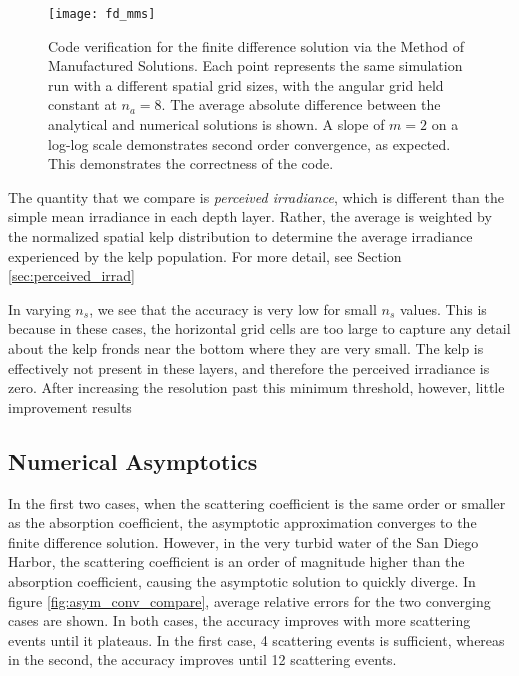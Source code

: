 \begin{figure}[H]
  \centering
  \vspace{-3em}
  \texttt{[image: fd\_mms]}
  \caption{Code verification for the finite difference solution via the Method of Manufactured Solutions. Each point represents the same simulation run with a different spatial grid sizes, with the angular grid held constant at $n_a=8$. The average absolute difference between the analytical and numerical solutions is shown. A slope of $m=2$ on a log-log scale demonstrates second order convergence, as expected. This demonstrates the correctness of the code.}
  \label{fig:fd_mms}
\end{figure}

The quantity that we compare is \textit{perceived irradiance}, which is different than the simple mean irradiance in each depth layer.
Rather, the average is weighted by the normalized spatial kelp distribution to determine the average irradiance experienced by the kelp population.
For more detail, see Section \ref{sec:perceived_irrad}

In varying $n_s$, we see that the accuracy is very low for small $n_s$ values.
This is because in these cases, the horizontal grid cells are too large to capture any detail
about the kelp fronds near the bottom where they are very small.
The kelp is effectively not present in these layers, and therefore the perceived irradiance is zero.
After increasing the resolution past this minimum threshold, however, little improvement results

\subsection{Numerical Asymptotics}

In the first two cases, when the scattering coefficient is the same order or smaller as the absorption coefficient,
the asymptotic approximation converges to the finite difference solution.
However, in the very turbid water of the San Diego Harbor, the scattering coefficient is an order of magnitude higher
than the absorption coefficient, causing the asymptotic solution to quickly diverge.
In figure \ref{fig:asym_conv_compare}, average relative errors for the two converging cases are shown.
In both cases, the accuracy improves with more scattering events until it plateaus.
In the first case, 4 scattering events is sufficient, whereas in the second, the accuracy improves until 12 scattering events.

